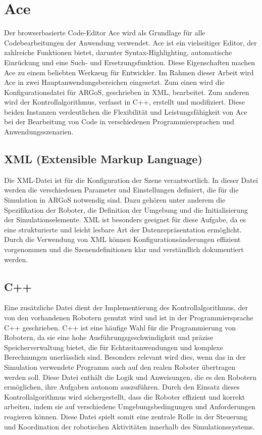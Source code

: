 \documentclass[german,version-2020-11]{uzl-thesis}
\begin{document}
\section{Ace}
  Der browserbasierte Code-Editor Ace \cite{ace} wird als Grundlage für alle Codebearbeitungen der Anwendung verwendet. 
  Ace ist ein vielseitiger Editor, der zahlreiche Funktionen bietet, darunter Syntax-Highlighting, automatische Einrückung und eine Such- und Ersetzungsfunktion. 
  Diese Eigenschaften machen Ace zu einem beliebten Werkzeug für Entwickler. Im Rahmen dieser Arbeit wird Ace in zwei Hauptanwendungsbereichen eingesetzt. 
  Zum einen wird die Konfigurationsdatei für ARGoS, geschrieben in XML, bearbeitet. Zum anderen wird der Kontrollalgorithmus, verfasst in C++, erstellt und modifiziert. 
  Diese beiden Instanzen verdeutlichen die Flexibilität und Leistungsfähigkeit von Ace bei der Bearbeitung von Code in verschiedenen Programmiersprachen und Anwendungsszenarien.

    \subsection{XML (Extensible Markup Language)} 
    Die XML-Datei ist für die Konfiguration der Szene verantwortlich. 
    In dieser Datei werden die verschiedenen Parameter und Einstellungen definiert, die für die Simulation in ARGoS notwendig sind. 
    Dazu gehören unter anderem die Spezifikation der Roboter, die Definition der Umgebung und die Initialisierung der Simulationselemente. 
    XML ist besonders geeignet für diese Aufgabe, da es eine strukturierte und leicht lesbare Art der Datenrepräsentation ermöglicht. 
    Durch die Verwendung von XML können Konfigurationsänderungen effizient vorgenommen und die Szenendefinitionen klar und verständlich dokumentiert werden.

    \subsection{C++}
    Eine zusätzliche Datei dient der Implementierung des Kontrollalgorithmus, 
    der von den vorhandenen Robotern genutzt wird und ist in der Programmiersprache C++ geschrieben. 
    C++ ist eine häufige Wahl für die Programmierung von Robotern, da sie eine hohe Ausführungsgeschwindigkeit und 
    präzise Speicherverwaltung bietet, die für Echtzeitanwendungen und komplexe Berechnungen unerlässlich sind.
    Besonders relevant wird dies, wenn das in der Simulation verwendete Programm auch auf den realen Roboter übertragen werden soll.
    Diese Datei enthält die Logik und Anweisungen, die es den Robotern ermöglichen, ihre Aufgaben autonom auszuführen. 
    Durch den Einsatz dieses Kontrollalgorithmus wird sichergestellt, dass die Roboter effizient und korrekt arbeiten, 
    indem sie auf verschiedene Umgebungsbedingungen und Anforderungen reagieren können. 
    Diese Datei spielt somit eine zentrale Rolle in der Steuerung und Koordination der robotischen Aktivitäten innerhalb des Simulationssystems.
\end{document}
